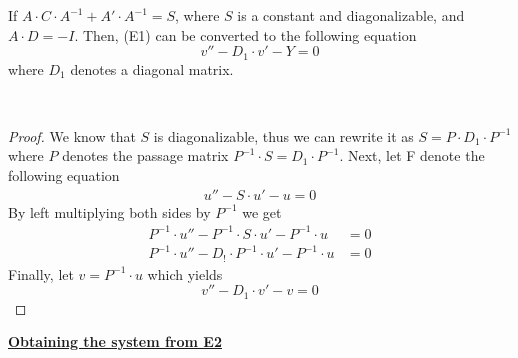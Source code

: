 \begin{namedtheorem}[Theorem 3.3.2]
If $A \cdot C \cdot A^{-1} + A' \cdot A^{-1} = S$, where $S$ is a constant and diagonalizable, and $A \cdot D = -I$. Then, (E1) can be converted to the following equation
\begin{equation}
\tag{E2}
    v'' - D_1 \cdot v' - Y = 0
\end{equation}
where $D_1$ denotes a diagonal matrix.
\end{namedtheorem}
\\
\begin{proof}
We know that $S$ is diagonalizable, thus we can rewrite it as $S = P \cdot D_1 \cdot P^{-1}$ where $P$ denotes the passage matrix $P^{-1} \cdot S = D_1 \cdot P^{-1}$. Next, let F denote the following equation
    \begin{equation}
    \tag{F}
        \begin{split}
            u'' - S \cdot u' - u = 0
        \end{split}
    \end{equation}
By left multiplying both sides by $P^{-1}$ we get
    \begin{equation*}
        \begin{split}
            P^{-1} \cdot u'' - P^{-1} \cdot S \cdot u' - P^{-1} \cdot u &= 0
            \\
            P^{-1} \cdot u'' - D_! \cdot P^{-1} \cdot u' - P^{-1} \cdot u &= 0
        \end{split}
    \end{equation*}
Finally, let $v = P^{-1} \cdot u$ which yields
    \begin{equation}
    \tag{E2}
        v'' - D_1 \cdot v' - v = 0
    \end{equation}
\end{proof}

\underline{\textbf{Obtaining the system from E2}}

